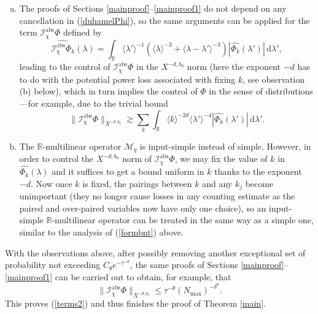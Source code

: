 \documentclass[11 pt,reqno]{amsart}
\theoremstyle{definition}
\theoremstyle{remark}
\numberwithin{equation}{section}
\newcommand{\Ic}{\mathcal{I}}
\renewcommand{\Mc}{\mathcal{M}}
\newcommand{\Rb}{\mathbb{R}}
\begin{document}
{\begin{enumerate}[(a)]
\item The proofs of Sections \ref{mainproof}--\ref{mainproof1} do not depend on any cancellation in (\ref{duhamelPhi}), so the same arguments can be applied for the term $\Ic_\chi^{\mathrm{abs}}\Phi$ defined by
\begin{equation}\label{duhamelPhi2}\widehat{\Ic_\chi^{\mathrm{abs}}\Phi_k}(\lambda)=\int_\Rb\langle\lambda'\rangle^{-1}(\langle\lambda\rangle^{-3}+\langle\lambda-\lambda'\rangle^{-3})|\widehat{\Phi_k}(\lambda')|\,\mathrm{d}\lambda',\end{equation} leading to the control of $\Ic_\chi^{\mathrm{abs}}\Phi$ in the $X^{-d,b_0}$ norm (here the exponent $-d$ has to do with the potential power loss associated with fixing $k$, see observation (b) below), which in turn implies the control of $\Phi$ in the sense of distributions---for example, due to the trivial bound \[\|\Ic_\chi^{\mathrm{abs}}\Phi\|_{X^{-d,b_0}}\gtrsim\sum_{k}\int_{\Rb}\langle k\rangle^{-2d}\langle\lambda'\rangle^{-4}|\widehat{\Phi_k}(\lambda')|\,\mathrm{d}\lambda'.\]
\item The $\Rb$-multilinear operator $\Mc_q$ is input-simple instead of simple. However, in order to control the $X^{-d,b_0}$ norm of $\Ic_\chi^{\mathrm{abs}}\Phi$, we may fix the value of $k$ in $\widehat{\Phi_k}(\lambda)$ and it suffices to get a bound uniform in $k$  thanks to the exponent $-d$. Now once $k$ is fixed, the pairings between $k$ and any $k_j$ become unimportant (they no longer cause losses in any counting estimate as the paired and over-paired variables now have only one choice), so an input-simple $\Rb$-multilinear operator can be treated in the same way as a simple one, similar to the analysis of (\ref{formbnt}) above.
\end{enumerate} 

With the observations above, after possibly removing another exceptional set of probability not exceeding $C_\theta e^{-\tau^{-\theta}}$, the same proofs of Sections \ref{mainproof}--\ref{mainproof1} can be carried out to obtain, for example, that
\begin{equation}\label{nonlinbound}\|\Ic_\chi^{\mathrm{abs}}\Phi\|_{X^{-d,b_0}}\leq\tau^{-\theta}(N_{\mathrm{max}})^{-\delta^6}.
 \end{equation} 
 This proves (\ref{terms2}) and thus finishes the proof of Theorem \ref{main}.
}
\end{document}
